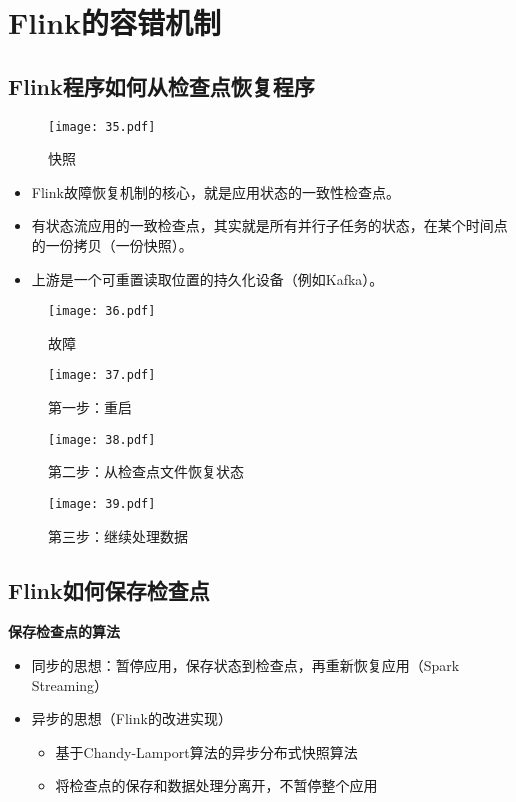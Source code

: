 \documentclass[cn,11pt,chinese]{elegantbook}
\begin{document}
\chapter{Flink的容错机制}

\section{Flink程序如何从检查点恢复程序}

\begin{figure}[htbp]
  \centering
  \texttt{[image: 35.pdf]}
  \caption{快照}
\end{figure}

\begin{itemize}
  \item Flink故障恢复机制的核心，就是应用状态的一致性检查点。
  \item 有状态流应用的一致检查点，其实就是所有并行子任务的状态，在某个时间点的一份拷贝（一份快照）。
  \item 上游是一个可重置读取位置的持久化设备（例如Kafka）。
\end{itemize}

\begin{figure}[htbp]
  \centering
  \texttt{[image: 36.pdf]}
  \caption{故障}
\end{figure}

\clearpage
\begin{figure}[htbp]
  \centering
  \texttt{[image: 37.pdf]}
  \caption{第一步：重启}
\end{figure}

\begin{figure}[htbp]
  \centering
  \texttt{[image: 38.pdf]}
  \caption{第二步：从检查点文件恢复状态}
\end{figure}

\begin{figure}[htbp]
  \centering
  \texttt{[image: 39.pdf]}
  \caption{第三步：继续处理数据}
\end{figure}

\section{Flink如何保存检查点}

\textbf{保存检查点的算法}

\begin{itemize}
  \item 同步的思想：暂停应用，保存状态到检查点，再重新恢复应用（Spark Streaming）
  \item 异步的思想（Flink的改进实现）
  \begin{itemize}
    \item 基于Chandy-Lamport算法的异步分布式快照算法
    \item 将检查点的保存和数据处理分离开，不暂停整个应用
  \end{itemize}
\end{itemize}
\end{document}
